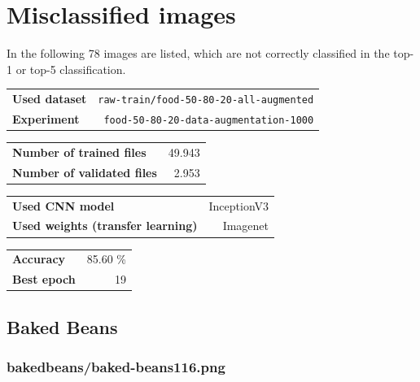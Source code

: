 
\section{Misclassified images}


        In the following 78 images are listed, which are not correctly classified in
        the top-1 or top-5 classification.
    \\

\raggedright
\begin{tabularx}{\textwidth}{X r}
    \textbf{Used dataset} & \texttt{raw-train/food-50-80-20-all-augmented}\\
    \textbf{Experiment} & \texttt{food-50-80-20-data-augmentation-1000}
\end{tabularx}

\raggedright
\vspace{6pt}
\begin{tabularx}{\textwidth}{X r}
    \textbf{Number of trained files} & 49.943\\
    \textbf{Number of validated files} & 2.953
\end{tabularx}

\raggedright
\vspace{6pt}
\begin{tabularx}{\textwidth}{X r}
    \textbf{Used CNN model} & InceptionV3\\
    \textbf{Used weights (transfer learning)} & Imagenet
\end{tabularx}

\raggedright
\vspace{6pt}
\begin{tabularx}{\textwidth}{X r}
    \textbf{Accuracy} & 85.60 \%\\
    \textbf{Best epoch} & 19
\end{tabularx}
    
\subsection{Baked Beans}
    
\subsubsection{baked\textunderscore beans/baked-beans116.png}

